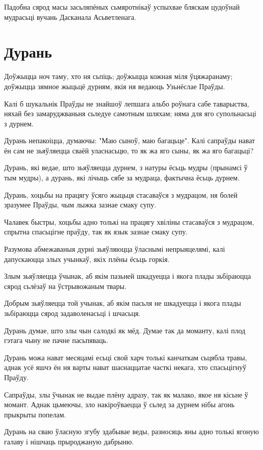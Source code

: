 \documentclass{article}
\begin{document}
Падобна сярод масы засьляпёных сьмяротнікаў успыхвае бляскам
цудоўнай мудрасьці вучань Дасканала Асьветленага.

\section{Дурань}

Доўжыцца ноч таму, хто ня сьпіць; доўжыцца кожная міля ўцяжаранаму;
доўжыцца зямное жыцьцё дурням, якія ня ведаюць Узьнёслае Праўды.

Калі б шукальнік Праўды не знайшоў лепшага альбо роўнага сабе
таварыства, няхай без замаруджваньня сьледуе самотным шляхам; няма для
яго супольнасьці з дурнем.

Дурань непакоіцца, думаючы: "Маю сыноў, маю багацьце". Калі сапраўды
нават ён сам не зьяўляецца сваёй уласнасьцю, то як жа яго сыны, як жа
яго багацьці?

Дурань, які ведае, што зьяўляецца дурнем, з натуры ёсьць мудры
(прынамсі ў тым мудры), а дурань, які лічыць сябе за мудраца, фактычна
ёсьць дурнем.

Дурань, хоцьбы на працягу ўсяго жыцьця стасаваўся з мудрацом, ня
болей зразумее Праўды, чым лыжка зазнае смаку супу.

Чалавек быстры, хоцьбы адно толькі на працягу хвіліны стасаваўся з
мудрацом, спрытна спасьцігне праўду, так як язык зазнае смаку супу.

Разумова абмежаваныя дурні зьяўляюцца ўласнымі непрыяцелямі, калі
дапускаюцца злых учынкаў, якіх плёны ёсьць горкія.

Злым зьяўляецца ўчынак, аб якім пазьней шкадуецца і якога плады
зьбіраюцца сярод сьлёзаў на ўстрывожаным твары.

Добрым зьяўляецца той учынак, аб якім пасьля не шкадуецца і якога
плады зьбіраюцца сярод задаволенасьці і шчасьця.

Дурань думае, што злы чын салодкі як мёд. Думае так да моманту, калі
плод гэтага чыну не пачне пасьпяваць.

Дурань можа нават месяцамі есьці свой харч толькі канчаткам сьцябла
травы, аднак усё яшчэ ён ня варты нават шаснаццатае часткі некага, хто
спасьцігнуў Праўду.

Сапраўды, злы ўчынак не выдае плёну адразу, так як малако, якое ня
кісьне ў момант. Аднак цьмеючы, зло накіроўваецца ў сьлед за дурнем нібы
агонь прыкрыты попелам.

Дурань на сваю ўласную згубу здабывае веды, разносяць яны адно
толькі ягоную галаву і нішчаць прыроджаную дабрыню.
\end{document}
